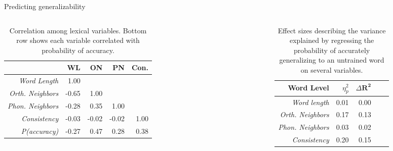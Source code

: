 \documentclass[final]{beamer}
\newlength{\twocolwid}
\begin{document}
\begin{frame}[t]
\begin{columns}[t]
\begin{column}{\twocolwid}
\begin{block}{Predicting generalizability}
\begin{columns}[t]
  \begin{column}{0.34\linewidth}
    \vspace{-1.1em}
    \begin{table}[t]
      \small
      \begin{tabular}{r r r r r}
       & \textbf{WL} & \textbf{ON} & \textbf{PN} & \textbf{Con.} \\
       \toprule
        \textit{Word Length}          &  1.00 & & & \\
        \textit{Orth. Neighbors}      & -0.65 &  1.00 & & \\
        \textit{Phon. Neighbors}      & -0.28 &  0.35 &  1.00 & \\
        \textit{Consistency}          & -0.03 & -0.02 & -0.02 & 1.00 \\
        \midrule
        \textit{P(accuracy)}          & -0.27  & 0.47 & 0.28 & 0.38 \\
      \end{tabular}
      \caption{Correlation among lexical variables. Bottom row shows each variable correlated with probability of accuracy.}
      \label{tab:cormat}
    \end{table}
  \end{column}

  \begin{column}{0.01\linewidth} \end{column}

  \begin{column}{0.32\linewidth}
    \begin{table}[t]
      \small
      \begin{center}
        \begin{tabular}{r r r r r}
          \textbf{Word Level} & $\eta^2_p$ & $\Delta \mathbf{R^2}$ \\
          \toprule
          \textit{Word length}       & 0.01 & 0.00 \\
          \textit{Orth. Neighbors}   & 0.17 & 0.13 \\
          \textit{Phon. Neighbors}   & 0.03 & 0.02 \\
          \textit{Consistency}       & 0.20 & 0.15 \\
          \bottomrule

        \end{tabular}
        \caption{Effect sizes describing the variance explained by regressing the probability of accurately generalizing to an untrained word on several variables.}
        \label{tab:effectsize}
      \end{center}
    \end{table}
  \end{column}


\end{columns}
\end{block}
\end{column}
\end{columns}
\end{frame}
\end{document}
